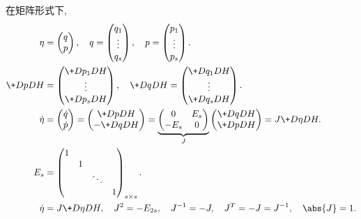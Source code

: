 \documentclass[../LectureNotes.tex]{subfiles}
\begin{document}
在矩阵形式下,
\begin{align*}
    \eta &= \begin{pmatrix}
        q \\ p
    \end{pmatrix},\quad q = \begin{pmatrix}
        q_1 \\ \vdots \\ q_s
    \end{pmatrix},\quad p = \begin{pmatrix}
        p_1 \\ \vdots \\ p_s
    \end{pmatrix}. \\
    \+DpDH &= \begin{pmatrix}
        \+D{p_1}DH \\ \vdots \\ \+D{p_s}DH
    \end{pmatrix},\quad \+DqDH = \begin{pmatrix}
        \+D{q_1}DH \\ \vdots \\ \+D{q_s}DH
    \end{pmatrix}. \\
    \dot{\eta} &= \begin{pmatrix}
        \dot{q} \\ \dot{p}
    \end{pmatrix} = \begin{pmatrix}
        \+DpDH \\ -\+DqDH
    \end{pmatrix} = \underbrace{\begin{pmatrix}
        0 & E_s \\
        -E_s & 0
    \end{pmatrix}}_{J} \begin{pmatrix}
        \+DqDH \\ \+DpDH
    \end{pmatrix} = J\+D\eta DH. \\
    E_s &= \begin{pmatrix}
        1 & & & \\
        & 1 & & \\
        & & \ddots & \\
        & & & 1
    \end{pmatrix}_{s\times s}. \\
    \dot{\eta} &= J\+D\eta DH,\quad J^2 = -E_{2s},\quad J^{-1} = -J,\quad J^T = -J = J^{-1}, \quad \abs{J} = 1.
\end{align*}
\end{document}
